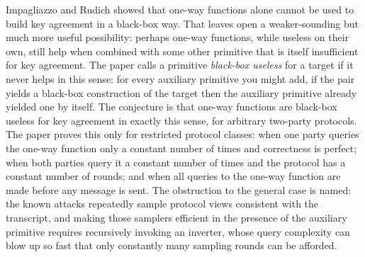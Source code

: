 \documentclass{aicr-conjecture}
\begin{document}

\vspace{0.4em}

\begin{informalconjecture}
Impagliazzo and Rudich showed that one-way functions alone cannot be used
to build key agreement in a black-box way. That leaves open a
weaker-sounding but much more useful possibility: perhaps one-way
functions, while useless on their own, still help when combined with some
other primitive that is itself insufficient for key agreement. The paper
calls a primitive \emph{black-box useless} for a target if it never helps
in this sense: for every auxiliary primitive you might add, if the pair
yields a black-box construction of the target then the auxiliary
primitive already yielded one by itself. The conjecture is that one-way
functions are black-box useless for key agreement in exactly this sense,
for arbitrary two-party protocols. The paper proves this only for
restricted protocol classes: when one party queries the one-way function
only a constant number of times and correctness is perfect; when both
parties query it a constant number of times and the protocol has a
constant number of rounds; and when all queries to the one-way function
are made before any message is sent. The obstruction to the general case
is named: the known attacks repeatedly sample protocol views consistent
with the transcript, and making those samplers efficient in the presence
of the auxiliary primitive requires recursively invoking an inverter,
whose query complexity can blow up so fast that only constantly many
sampling rounds can be afforded.
\end{informalconjecture}
\end{document}
